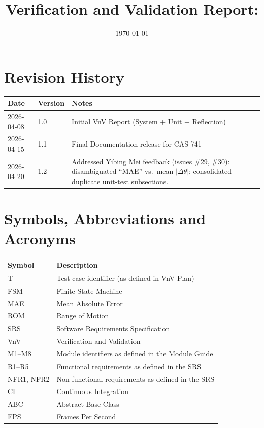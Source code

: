 \documentclass[12pt, titlepage]{article}
\begin{document}
\title{Verification and Validation Report: \progname}
\author{\authname}
\date{\today}

\maketitle


\section*{Revision History}

\begin{tabularx}{\textwidth}{p{3cm}p{2cm}X}
\toprule {\bf Date} & {\bf Version} & {\bf Notes}\\
\midrule
2026-04-08 & 1.0 & Initial VnV Report (System + Unit + Reflection)\\
2026-04-15 & 1.1 & Final Documentation release for CAS 741\\
2026-04-20 & 1.2 & Addressed Yibing Mei feedback (issues \#29, \#30): disambiguated ``MAE'' vs.\ mean $|\Delta\theta|$; consolidated duplicate unit-test subsections.\\
\bottomrule
\end{tabularx}

\newpage

\section{Symbols, Abbreviations and Acronyms}

\renewcommand{\arraystretch}{1.2}
\begin{tabular}{l l}
  \toprule
  \textbf{Symbol} & \textbf{Description}\\
  \midrule
  T    & Test case identifier (as defined in VnV Plan)\\
  FSM  & Finite State Machine\\
  MAE  & Mean Absolute Error\\
  ROM  & Range of Motion\\
  SRS  & Software Requirements Specification\\
  VnV  & Verification and Validation\\
  M1--M8 & Module identifiers as defined in the Module Guide\\
  R1--R5 & Functional requirements as defined in the SRS\\
  NFR1, NFR2 & Non-functional requirements as defined in the SRS\\
  CI   & Continuous Integration\\
  ABC  & Abstract Base Class\\
  FPS  & Frames Per Second\\
  \bottomrule
\end{tabular}
\end{document}
